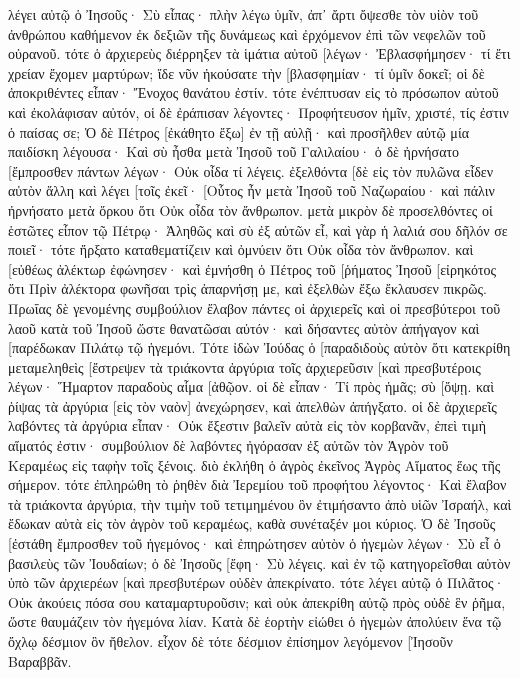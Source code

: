 λέγει αὐτῷ ὁ Ἰησοῦς· Σὺ εἶπας· πλὴν λέγω ὑμῖν, ἀπ᾽ ἄρτι ὄψεσθε τὸν υἱὸν τοῦ ἀνθρώπου καθήμενον ἐκ δεξιῶν τῆς δυνάμεως καὶ ἐρχόμενον ἐπὶ τῶν νεφελῶν τοῦ οὐρανοῦ. 
τότε ὁ ἀρχιερεὺς διέρρηξεν τὰ ἱμάτια αὐτοῦ [λέγων· Ἐβλασφήμησεν· τί ἔτι χρείαν ἔχομεν μαρτύρων; ἴδε νῦν ἠκούσατε τὴν [βλασφημίαν· 
τί ὑμῖν δοκεῖ; οἱ δὲ ἀποκριθέντες εἶπαν· Ἔνοχος θανάτου ἐστίν. 
τότε ἐνέπτυσαν εἰς τὸ πρόσωπον αὐτοῦ καὶ ἐκολάφισαν αὐτόν, οἱ δὲ ἐράπισαν 
λέγοντες· Προφήτευσον ἡμῖν, χριστέ, τίς ἐστιν ὁ παίσας σε; 
Ὁ δὲ Πέτρος [ἐκάθητο ἔξω] ἐν τῇ αὐλῇ· καὶ προσῆλθεν αὐτῷ μία παιδίσκη λέγουσα· Καὶ σὺ ἦσθα μετὰ Ἰησοῦ τοῦ Γαλιλαίου· 
ὁ δὲ ἠρνήσατο [ἔμπροσθεν πάντων λέγων· Οὐκ οἶδα τί λέγεις. 
ἐξελθόντα [δὲ εἰς τὸν πυλῶνα εἶδεν αὐτὸν ἄλλη καὶ λέγει [τοῖς ἐκεῖ· [Οὗτος ἦν μετὰ Ἰησοῦ τοῦ Ναζωραίου· 
καὶ πάλιν ἠρνήσατο μετὰ ὅρκου ὅτι Οὐκ οἶδα τὸν ἄνθρωπον. 
μετὰ μικρὸν δὲ προσελθόντες οἱ ἑστῶτες εἶπον τῷ Πέτρῳ· Ἀληθῶς καὶ σὺ ἐξ αὐτῶν εἶ, καὶ γὰρ ἡ λαλιά σου δῆλόν σε ποιεῖ· 
τότε ἤρξατο καταθεματίζειν καὶ ὀμνύειν ὅτι Οὐκ οἶδα τὸν ἄνθρωπον. καὶ [εὐθέως ἀλέκτωρ ἐφώνησεν· 
καὶ ἐμνήσθη ὁ Πέτρος τοῦ [ῥήματος Ἰησοῦ [εἰρηκότος ὅτι Πρὶν ἀλέκτορα φωνῆσαι τρὶς ἀπαρνήσῃ με, καὶ ἐξελθὼν ἔξω ἔκλαυσεν πικρῶς. 
Πρωΐας δὲ γενομένης συμβούλιον ἔλαβον πάντες οἱ ἀρχιερεῖς καὶ οἱ πρεσβύτεροι τοῦ λαοῦ κατὰ τοῦ Ἰησοῦ ὥστε θανατῶσαι αὐτόν· 
καὶ δήσαντες αὐτὸν ἀπήγαγον καὶ [παρέδωκαν Πιλάτῳ τῷ ἡγεμόνι. 
Τότε ἰδὼν Ἰούδας ὁ [παραδιδοὺς αὐτὸν ὅτι κατεκρίθη μεταμεληθεὶς [ἔστρεψεν τὰ τριάκοντα ἀργύρια τοῖς ἀρχιερεῦσιν [καὶ πρεσβυτέροις 
λέγων· Ἥμαρτον παραδοὺς αἷμα [ἀθῷον. οἱ δὲ εἶπαν· Τί πρὸς ἡμᾶς; σὺ [ὄψῃ. 
καὶ ῥίψας τὰ ἀργύρια [εἰς τὸν ναὸν] ἀνεχώρησεν, καὶ ἀπελθὼν ἀπήγξατο. 
οἱ δὲ ἀρχιερεῖς λαβόντες τὰ ἀργύρια εἶπαν· Οὐκ ἔξεστιν βαλεῖν αὐτὰ εἰς τὸν κορβανᾶν, ἐπεὶ τιμὴ αἵματός ἐστιν· 
συμβούλιον δὲ λαβόντες ἠγόρασαν ἐξ αὐτῶν τὸν Ἀγρὸν τοῦ Κεραμέως εἰς ταφὴν τοῖς ξένοις. 
διὸ ἐκλήθη ὁ ἀγρὸς ἐκεῖνος Ἀγρὸς Αἵματος ἕως τῆς σήμερον. 
τότε ἐπληρώθη τὸ ῥηθὲν διὰ Ἰερεμίου τοῦ προφήτου λέγοντος· Καὶ ἔλαβον τὰ τριάκοντα ἀργύρια, τὴν τιμὴν τοῦ τετιμημένου ὃν ἐτιμήσαντο ἀπὸ υἱῶν Ἰσραήλ, 
καὶ ἔδωκαν αὐτὰ εἰς τὸν ἀγρὸν τοῦ κεραμέως, καθὰ συνέταξέν μοι κύριος. 
Ὁ δὲ Ἰησοῦς [ἐστάθη ἔμπροσθεν τοῦ ἡγεμόνος· καὶ ἐπηρώτησεν αὐτὸν ὁ ἡγεμὼν λέγων· Σὺ εἶ ὁ βασιλεὺς τῶν Ἰουδαίων; ὁ δὲ Ἰησοῦς [ἔφη· Σὺ λέγεις. 
καὶ ἐν τῷ κατηγορεῖσθαι αὐτὸν ὑπὸ τῶν ἀρχιερέων [καὶ πρεσβυτέρων οὐδὲν ἀπεκρίνατο. 
τότε λέγει αὐτῷ ὁ Πιλᾶτος· Οὐκ ἀκούεις πόσα σου καταμαρτυροῦσιν; 
καὶ οὐκ ἀπεκρίθη αὐτῷ πρὸς οὐδὲ ἓν ῥῆμα, ὥστε θαυμάζειν τὸν ἡγεμόνα λίαν. 
Κατὰ δὲ ἑορτὴν εἰώθει ὁ ἡγεμὼν ἀπολύειν ἕνα τῷ ὄχλῳ δέσμιον ὃν ἤθελον. 
εἶχον δὲ τότε δέσμιον ἐπίσημον λεγόμενον [Ἰησοῦν Βαραββᾶν. 
